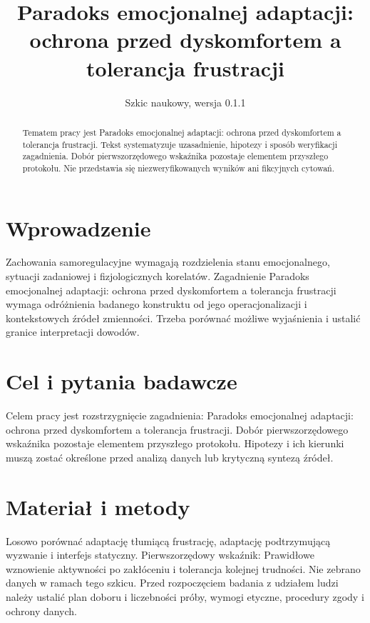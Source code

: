 \documentclass[11pt,a4paper]{article}
\title{Paradoks emocjonalnej adaptacji: ochrona przed dyskomfortem a tolerancja frustracji}
\author{}
\date{Szkic naukowy, wersja 0.1.1}
\begin{document}
\maketitle

\begin{abstract}

Tematem pracy jest Paradoks emocjonalnej adaptacji: ochrona przed dyskomfortem a tolerancja frustracji. Tekst systematyzuje uzasadnienie, hipotezy i sposób weryfikacji zagadnienia. Dobór pierwszorzędowego wskaźnika pozostaje elementem przyszłego protokołu. Nie przedstawia się niezweryfikowanych wyników ani fikcyjnych cytowań.

\end{abstract}

\section{Wprowadzenie}

Zachowania samoregulacyjne wymagają rozdzielenia stanu emocjonalnego, sytuacji zadaniowej i fizjologicznych korelatów. Zagadnienie Paradoks emocjonalnej adaptacji: ochrona przed dyskomfortem a tolerancja frustracji wymaga odróżnienia badanego konstruktu od jego operacjonalizacji i kontekstowych źródeł zmienności. Trzeba porównać możliwe wyjaśnienia i ustalić granice interpretacji dowodów.

\section{Cel i pytania badawcze}

Celem pracy jest rozstrzygnięcie zagadnienia: Paradoks emocjonalnej adaptacji: ochrona przed dyskomfortem a tolerancja frustracji. Dobór pierwszorzędowego wskaźnika pozostaje elementem przyszłego protokołu. Hipotezy i ich kierunki muszą zostać określone przed analizą danych lub krytyczną syntezą źródeł.

\section{Materiał i metody}

Losowo porównać adaptację tłumiącą frustrację, adaptację podtrzymującą wyzwanie i interfejs statyczny. Pierwszorzędowy wskaźnik: Prawidłowe wznowienie aktywności po zakłóceniu i tolerancja kolejnej trudności. Nie zebrano danych w ramach tego szkicu. Przed rozpoczęciem badania z udziałem ludzi należy ustalić plan doboru i liczebności próby, wymogi etyczne, procedury zgody i ochrony danych.
\end{document}
